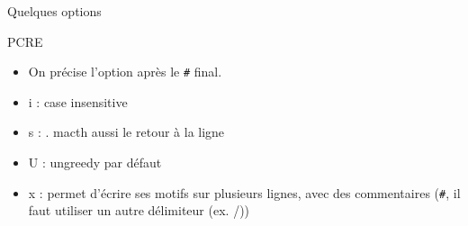\def\ftitle{Quelques options}
\begin{frame}[containsverbatim]{\ftitle}
\def\blocktitle{PCRE}
\begin{block}{\blocktitle}
\begin{itemize}
\item On précise l'option après le \verb!#! final.
\item i : case insensitive
\item s : . macth aussi le retour à la ligne
\item U : ungreedy par défaut
\item x : permet d'écrire ses motifs sur plusieurs lignes, avec des commentaires (\verb!#!, il faut utiliser un autre délimiteur (ex. /))
\end{itemize}
\end{block}
\end{frame}

